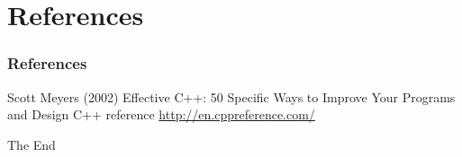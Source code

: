 \documentclass{beamer}
\begin{document}
\section{References}
\begin{frame}
\frametitle{References}
\footnotesize{
\begin{thebibliography}{99} %
 Scott Meyers (2002)
\newblock Effective C++: 50 Specific Ways to Improve Your Programs and Design
 C++ reference
\newblock \url{http://en.cppreference.com/}
\end{thebibliography}
}
\end{frame}


\begin{frame}
\Huge{\centerline{The End}}
\end{frame}

\end{document}
